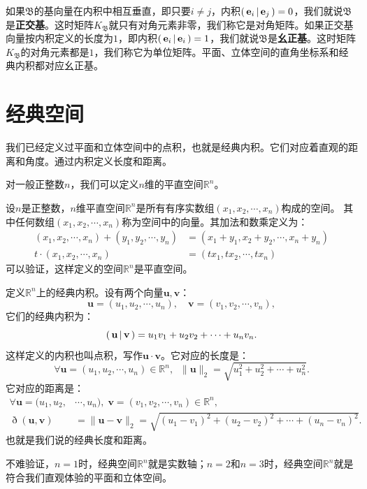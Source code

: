 \documentclass[12pt,UTF8]{ctexbook}
\begin{document}
如果$\mathfrak{B}$的基向量在内积中相互垂直，即只要$i\neq j$，内积$\displaystyle\left( \,\mathbf{e}_i \,\middle\vert \,\mathbf{e}_j \,\right) = 0$，我们就说$\mathfrak{B}$是\textbf{正交基}。这时矩阵$K_{\mathfrak{B}}$就只有对角元素非零，我们称它是对角矩阵。如果正交基向量按内积定义的长度为$1$，即内积$\displaystyle\left( \,\mathbf{e}_i \,\middle\vert \,\mathbf{e}_i \,\right) = 1$，我们就说$\mathfrak{B}$是\textbf{幺正基}。这时矩阵$K_{\mathfrak{B}}$的对角元素都是$1$，我们称它为单位矩阵。平面、立体空间的直角坐标系和经典内积都对应幺正基。

\section{经典空间}

我们已经定义过平面和立体空间中的点积，也就是经典内积。它们对应着直观的距离和角度。通过内积定义长度和距离。

对一般正整数$n$，我们可以定义$n$维的平直空间$\mathbb{R}^n$。
\begin{df}
    设$n$是正整数，$n$维平直空间$\mathbb{R}^n$是所有有序实数组$(x_1, x_2, \cdots, x_n)$构成的空间。
    其中任何数组$(x_1, x_2, \cdots, x_n)$称为空间中的向量。其加法和数乘定义为：
    \begin{align*}
        (x_1, x_2, \cdots, x_n) + (y_1, y_2, \cdots, y_n) &= (x_1 + y_1, x_2 + y_2, \cdots, x_n + y_n) \\
        t\cdot (x_1, x_2, \cdots, x_n) &= (tx_1, tx_2, \cdots, t x_n)
    \end{align*}
    可以验证，这样定义的空间$\mathbb{R}^n$是平直空间。

    定义$\mathbb{R}^n$上的经典内积。设有两个向量$\mathbf{u}, \mathbf{v}$：
    $$ \mathbf{u} = (u_1, u_2, \cdots, u_n), \quad  \mathbf{v} = (v_1, v_2, \cdots, v_n), $$
    它们的经典内积为：
    $$ \displaystyle\left( \,\mathbf{u} \,\middle\vert \,\mathbf{v} \,\right) = u_1v_1 + u_2v_2 + \cdots + u_n v_n.$$
    这样定义的内积也叫点积，写作$\mathbf{u}\cdot \mathbf{v}$。它对应的长度是：
    $$ \forall \mathbf{u} = (u_1, u_2, \cdots, u_n) \in \mathbb{R}^n, \;\; \| \mathbf{u}\|_2 = \sqrt{u_1^2 + u_2^2 + \cdots + u_n^2} .$$
    它对应的距离是：
    \begin{align*}
        \forall \mathbf{u} = (u_1, u_2, &\cdots, u_n), \; \mathbf{v} = (v_1, v_2, \cdots, v_n) \in \mathbb{R}^n, \\
        \eth(\mathbf{u}, \mathbf{v}) &= \| \mathbf{u} - \mathbf{v}\|_2 = \sqrt{(u_1 - v_1)^2 + (u_2 - v_2)^2 + \cdots + (u_n - v_n)^2} .
    \end{align*}
    也就是我们说的经典长度和距离。
\end{df}
不难验证，$n=1$时，经典空间$\mathbb{R}^n$就是实数轴；$n=2$和$n=3$时，经典空间$\mathbb{R}^n$就是符合我们直观体验的平面和立体空间。
\end{document}
